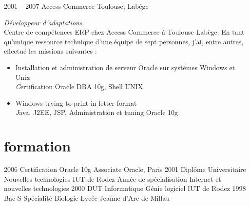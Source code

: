 \documentclass{friggeri-cv} 	%
\begin{document}
\begin{entrylist}
{\begin{itemize}
\end{itemize}
}
\entry
{2001 -- 2007}
{Access-Commerce}
{Toulouse, Labège}
{\emph{Développeur d'adaptations} \\
Centre de compétences ERP chez Access Commerce à Toulouse Labège.
En tant qu’unique ressource technique d'une équipe de sept personnes, j’ai, entre autres, effectué les
missions suivantes :
\begin{itemize}
\item Installation et administration de serveur Oracle sur systèmes Windows et Unix \\
	{\footnotesize \textit Certification Oracle DBA 10g, Shell UNIX}
\item Windows trying to print in letter format \\
	{\footnotesize \textit Java, J2EE, JSP, Administration et tuning Oracle 10g}
\end{itemize}
}
\end{entrylist}
\newpage


\section{formation}

\begin{entrylist}
\entry
{2006}
{Certification Oracle {\normalfont 10g Associate}}
{Oracle, Paris}
{}
\entry
{2001}
{Diplôme Universitaire {\normalfont Nouvelles technologies}}
{IUT de Rodez}
{Année de spécialisation Internet et nouvelles technologies}
\entry
{2000}
{DUT {\normalfont Informatique Génie logiciel}}
{IUT de Rodez}
{}
\entry
{1998}
{Bac S {\normalfont Spécialité Biologie}}
{Lycée Jeanne d'Arc de Millau}
{}
\end{entrylist}

\end{document}
